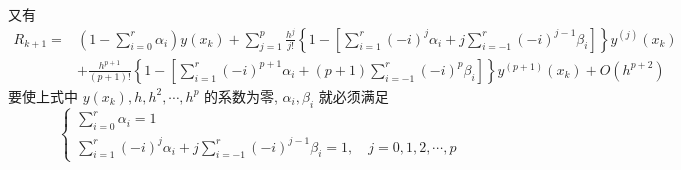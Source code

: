 \documentclass[12pt,a4paper,UTF8]{ctexart}
\theoremstyle{nonumberplain}
\begin{document}
\begin{enumerate}
\begin{enumerate}
$$                    $$
                    又有
                    $$
                        \begin{aligned}
                            R_{k+1}= & \left(1-\sum_{i=0}^{r} \alpha_{i}\right) y\left(x_{k}\right)+\sum_{j=1}^{p} \frac{h^{j}}{j !}\left\{1-\left[\sum_{i=1}^{r}(-i)^{j} \alpha_{i}+j \sum_{i=-1}^{r}(-i)^{j-1} \beta_{i}\right]\right\} y^{(j)}\left(x_{k}\right) \\
                                     & +\frac{h^{p+1}}{(p+1) !}\left\{1-\left[\sum_{i=1}^{r}(-i)^{p+1} \alpha_{i}+(p+1) \sum_{i=-1}^{r}(-i)^{p} \beta_{i}\right]\right\} y^{(p+1)}\left(x_{k}\right)+O\left(h^{p+2}\right)
                        \end{aligned}
                    $$
                    要使上式中 $y\left(x_{k}\right), h, h^{2}, \cdots, h^{p}$ 的系数为零, $\alpha_{i}, \beta_{i}$ 就必须满足
                    \begin{equation}\label{33}
                        \left\{\begin{array}{l}
                            \sum_{i=0}^{r} \alpha_{i}=1 \\
                            \sum_{i=1}^{r}(-i)^{j} \alpha_{i}+j \sum_{i=-1}^{r}(-i)^{j-1} \beta_{i}=1, \quad j=0,1,2, \cdots, p
                        \end{array}\right.
                    \end{equation}


\end{enumerate}
\end{enumerate}
\end{document}
